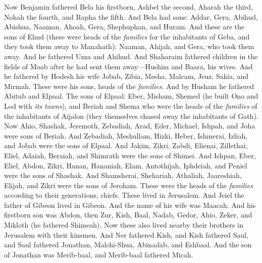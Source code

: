 \begin{biblechapter} %
 Now Benjamin fathered Bela his firstborn, Ashbel the second, Aharah the third,
\verse Nohah the fourth, and Rapha the fifth.
\verse And Bela had sons: Addar, Gera, Abihud,
\verse Abishua, Naaman, Ahoah,
\verse Gera, Shephuphan, and Huram.
\verse And these are the sons of Ehud (these were heads of the \textit{families} for the inhabitants of Geba, and they took them away to Manahath):
\verse Naaman, Ahijah, and Gera, who took them away. And he fathered Uzza and Ahihud.
\verse And Shaharaim fathered children in the fields of Moab after he had sent them away—Hushim and Baara, his wives.
\verse And he fathered by Hodesh his wife Jobab, Zibia, Mesha, Malcam,
\verse Jeuz, Sakia, and Mirmah. These were his sons, heads of the \textit{families}.
\verse And by Husham he fathered Abitub and Elpaal.
\verse The sons of Elpaal: Eber, Misham, Shemed (he built Ono and Lod with \textit{its towns}),
\verse and Beriah and Shema who were the heads of the \textit{families} of the inhabitants of Aijalon (they themselves chased away the inhabitants of Gath).
\verse Now Ahio, Shashak, Jeremoth,
\verse Zebadiah, Arad, Eder,
\verse Michael, Ishpah, and Joha were sons of Beriah.
\verse And Zebadiah, Meshullam, Hizki, Heber,
\verse Ishmerai, Izliah, and Jobab were the sons of Elpaal.
\verse And Jakim, Zikri, Zabdi,
\verse Elienai, Zillethai, Eliel,
\verse Adaiah, Beraiah, and Shimrath were the sons of Shimei.
\verse And Ishpan, Eber, Eliel,
\verse Abdon, Zikri, Hanan,
\verse Hananiah, Elam, Antothijah,
\verse Iphdeiah, and Peniel were the sons of Shashak.
\verse And Shamsherai, Shehariah, Athaliah,
\verse Jaareshiah, Elijah, and Zikri were the sons of Jeroham.
\verse These were the heads of the \textit{families} according to their generations, chiefs. These lived in Jerusalem.
\verse And Jeiel the father of Gibeon lived in Gibeon. And the name of his wife was Maacah.
\verse And his firstborn son was Abdon, then Zur, Kish, Baal, Nadab,
\verse Gedor, Ahio, Zeker,
\verse and Mikloth (he fathered Shimeah). Now these also lived nearby their brothers in Jerusalem with their kinsmen.
\verse And Ner fathered Kish, and Kish fathered Saul, and Saul fathered Jonathan, Malchi-Shua, Abinadab, and Eshbaal.
\verse And the son of Jonathan was Merib-baal, and Merib-baal fathered Micah.

\end{biblechapter}
